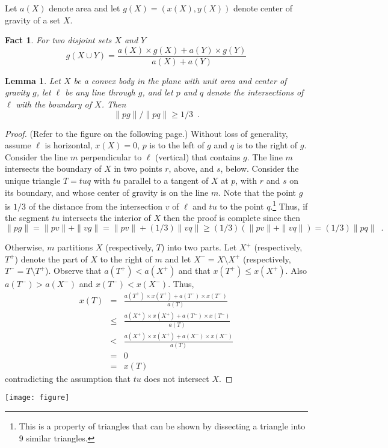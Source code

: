 \documentclass[12pt]{article}
\newtheorem{lem}{Lemma}
\newtheorem{fact}{Fact}
\begin{document}
Let $a(X)$ denote area and let $g(X)=(x(X),y(X))$
denote center of gravity of a set $X$.

\begin{fact}
For two disjoint sets $X$ and $Y$
\[
    g(X\cup Y)=
         \frac{a(X)\times g(X) + a(Y)\times g(Y)}{a(X) +a(Y)}
\]
\end{fact}

\begin{lem}
Let $X$ be a convex body in the plane with unit area and center of gravity $g$,
let $\ell$ be any line through $g$, and let $p$ and $q$ denote the
intersections of $\ell$ with the boundary of $X$.  Then
\[
        \|pg\| / \|pq\| \ge 1/3 \enspace .
\]
\end{lem}

\begin{proof}
(Refer to the figure on the following page.)
Without loss of generality, assume $\ell$ is horizontal, $x(X)=0$, $p$
is to the left of $g$ and $q$ is to the right of $g$.  Consider the
line $m$ perpendicular to $\ell$ (vertical) that contains $g$.  The
line $m$ intersects the boundary of $X$ in two points $r$, above, and
$s$, below. Consider the unique triangle $T=tuq$ with $tu$ parallel to
a tangent of $X$ at $p$, with $r$ and $s$ on its boundary, and whose
center of gravity is on the line $m$.  Note that the point $g$ is
$1/3$ of the distance from the intersection $v$ of $\ell$ and $tu$ to the point
$q$.\footnote{This is a property of triangles that can be shown by
dissecting a triangle into 9 similar triangles.} Thus,
if the segment $tu$ intersects the interior of $X$ then the proof is
complete since then
\[
       \|pg\| = \|pv\|+\|vg\| = \|pv\| + (1/3)\|vq\| \ge
(1/3)(\|pv\|+\|vq\|) = (1/3)\|pq\| \enspace .
\]

Otherwise, $m$ partitions $X$ (respectively, $T$) into two parts.  Let
$X^+$ (respectively, $T^+$) denote the part of $X$ to the right of $m$
and let $X^-=X\setminus X^+$ (respectively, $T^-=T\setminus T^+$).
Observe that $a(T^+) < a(X^+)$ and that $x(T^+)\le x(X^+)$.  Also
$a(T^-) > a(X^-)$ and $x(T^-) < x(X^-)$.  Thus,
\begin{eqnarray*}
   x(T) & = & \frac{a(T^+)\times x(T^+)
                   + a(T^-)\times x(T^-)}{a(T)} \\
        & \le & \frac{a(X^+)\times x(X^+) 
                   + a(T^-)\times x(T^-)}{a(T)} \\
        & < & \frac{a(X^+)\times x(X^+)
                   + a(X^-)\times x(X^-)}{a(T)} \\
        & = & 0 \\
        & = & x(T)
\end{eqnarray*}
contradicting the assumption that $tu$ does not intersect $X$.
\end{proof}
\begin{center}
  \texttt{[image: figure]}
\end{center}
\end{document}
